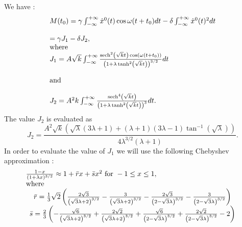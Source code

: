 \documentclass{ws-ijbc}
\begin{document}
We have : 
\begin{equation}
\begin{tabular}{l}
$M(t_{0})=\gamma \int_{-\infty }^{+\infty }\dot{x}^{0}(t)\cos \omega
(t+t_{0})dt-\delta \int_{-\infty }^{+\infty }\dot{x}^{0}(t)^{2}dt$ \\ 
\\ 
$=\gamma J_{1}-\delta J_{2}$, \\ 
where \\ 
$J_{1}=A\sqrt{k}\int_{-\infty }^{+\infty }\frac{\text{sech}^{2}\left( \sqrt{k%
}t\right) \cos \left( \omega \left( t+t_{0}\right) \right) }{\left(
1+\lambda \tanh ^{2}\left( \sqrt{k}t\right) \right) ^{3/2}}dt$ \\ 
\\ 
and \\ 
\\ 
$J_{2}=A^{2}k\int_{-\infty }^{+\infty }\frac{\text{sech}^{4}\left( \sqrt{k}%
t\right) }{\left( 1+\lambda \tanh ^{2}\left( \sqrt{k}t\right) \right) ^{3}}%
dt.$%
\end{tabular}
\label{c14}
\end{equation}%
The value $J_{2}$ is evaluated as 
\begin{equation}
J_{2}=\frac{A^{2}\sqrt{k}\left( \sqrt{\lambda }(3\lambda +1)+(\lambda
+1)(3\lambda -1)\tan ^{-1}\left( \sqrt{\lambda }\right) \right) }{4\lambda
^{3/2}(\lambda +1)}.  \label{c15}
\end{equation}%
In order to evaluate the value of $J_{1}$ we will use the following
Chebyshev approximation : 
\begin{equation}
\begin{array}{l}
\frac{1-x}{(1+\lambda x)^{3/2}}\approx 1+\bar{r}x+\bar{s}x^{2}\text{ for }%
-1\leq x\leq 1, \\ 
\text{where} \\ 
\begin{array}{c}
\bar{r}=\frac{1}{3}\sqrt{2}\left( \frac{2\sqrt{3}}{\left( \sqrt{3}\lambda
+2\right) ^{3/2}}-\frac{3}{\left( \sqrt{3}\lambda +2\right) ^{3/2}}-\frac{2%
\sqrt{3}}{\left( 2-\sqrt{3}\lambda \right) ^{3/2}}-\frac{3}{\left( 2-\sqrt{3}%
\lambda \right) ^{3/2}}\right)  \\ 
\bar{s}=\frac{2}{3}\left( -\frac{\sqrt{6}}{\left( \sqrt{3}\lambda +2\right)
^{3/2}}+\frac{2\sqrt{2}}{\left( \sqrt{3}\lambda +2\right) ^{3/2}}+\frac{%
\sqrt{6}}{\left( 2-\sqrt{3}\lambda \right) ^{3/2}}+\frac{2\sqrt{2}}{\left( 2-%
\sqrt{3}\lambda \right) ^{3/2}}-2\right) 
\end{array}%
\end{array}
\label{c16}
\end{equation}%
\end{document}
